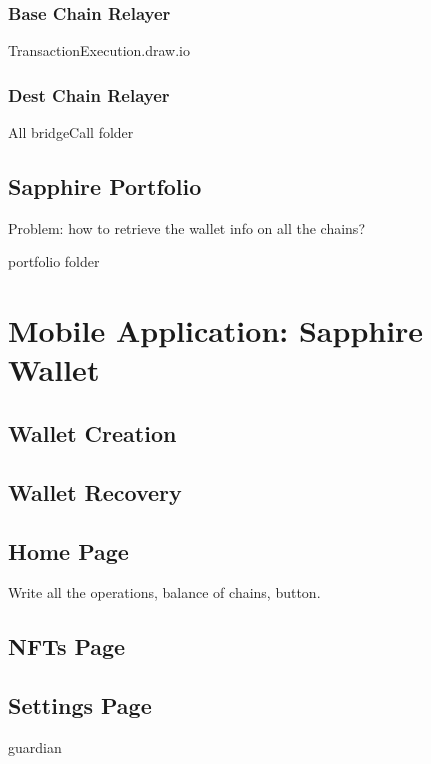 \subsubsection{Base Chain Relayer}
\label{subsubsec:base_chain_relayer}

TransactionExecution.draw.io

\subsubsection{Dest Chain Relayer}
\label{subsubsec:dest_chain_relayer}

All bridgeCall folder

\subsection{Sapphire Portfolio}
\label{subsec:sapphire_portfolio}

Problem: how to retrieve the wallet info on all the chains?

portfolio folder

\section{Mobile Application: Sapphire Wallet}
\label{sec:mobile_application}

\subsection{Wallet Creation}
\label{subsec:wallet_creation}

\subsection{Wallet Recovery}
\label{subsec:wallet_recovery}

\subsection{Home Page}
\label{subsec:wallet_home_page}

Write all the operations, balance of chains, button.

\subsection{NFTs Page}
\label{subsec:nfts_page}

\subsection{Settings Page}
\label{subsec:settings_page}

guardian

